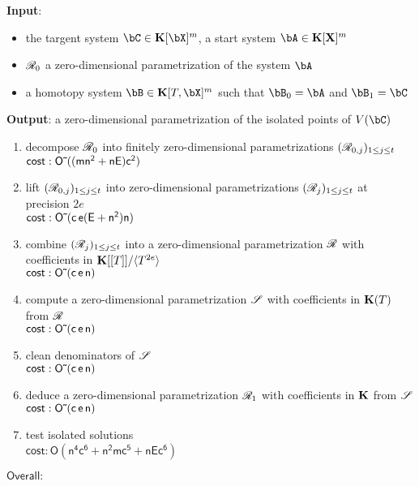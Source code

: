 \documentclass[12pt]{article}
\begin{document}
\begin{algorithm}
\caption{$\mathsf{}$}
{\bf Input}:\begin{itemize}
\item the targent system $\bC \in \KK[\bX]^{m}$, a start system $\bA \in \KK[\X]^m$
\item $\mathscr{R}_0$ a zero-dimensional parametrization of the system $\bA$
\item a homotopy system $\bB \in \KK[T,\bX]^m$ such that $\bB_{0} = \bA$ and $\bB_1 = \bC$
\end{itemize}
{\bf Output}: a zero-dimensional parametrization of the isolated points of $V(\bC)$
\begin{enumerate}
\item decompose $\mathscr{R}_0$ into finitely zero-dimensional parametrizations $(\mathscr{R}_{0,j})_{1 \leq j \leq t}$\\
$\mathsf{cost: {O}{\,\tilde{ }\,}((mn^2 + nE) c^2)}$
\item lift $(\mathscr{R}_{0,j})_{1 \leq j \leq t}$ into zero-dimensional parametrizations $(\mathscr{R}_j)_{1\leq j \leq t}$ at precision $2e$\\
$\mathsf{cost: {O}{\,\tilde{ }\,}(c\,e (E+n^2)n)}$
\item combine $(\mathscr{R}_j)_{1 \leq j \leq t}$ into a zero-dimensional parametrization $\mathscr{R}$ with coefficients in $\mathbf{K}[[T]]/\langle T^{2e}\rangle$\\
$\mathsf{cost: {O}{\,\tilde{ }\,}(c\,e\,n)}$
\item compute a zero-dimensional parametrization $\mathscr{S}$ with coefficients in $\mathbf{K}(T)$ from $\mathscr{R}$\\
$\mathsf{cost: {O}{\,\tilde{ }\,}(c\,e\,n)}$
\item clean denominators of $\mathscr{S}$\\
$\mathsf{cost: {O}{\,\tilde{ }\,}(c\,e\,n)}$
\item deduce a zero-dimensional parametrization $\mathscr{R}_1$ with coefficients in $\mathbf{K}$ from $\mathscr{S}$\\
$\mathsf{cost: {O}{\,\tilde{ }\,}(c\,e\,n)}$
\item test isolated solutions \\
$\mathsf{cost: O(n^4 c^6 + n^2 m c^5 + n E c^6)}$
\end{enumerate}
$\mathsf{Overall: }$
\label{DetSys}
\end{algorithm}
\end{document}
